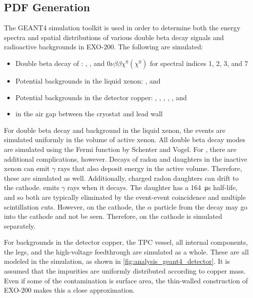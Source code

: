 \documentclass[herrin-thesis.tex]{subfiles}
\begin{document}
\subsection{PDF Generation}

The GEANT4 simulation toolkit\cite{Agostinelli:2003fk} is used in order to determine both the energy spectra and spatial distributions of various double beta decay signals and radioactive backgrounds in EXO-200. The following are simulated:
\begin{itemize}
\item Double beta decay of :
	\twonu{},
	\zeronu{},
	and \(0\nu\beta\beta\chi^{0}(\chi^{0})\) for spectral indices 1, 2, 3, and 7
\item Potential backgrounds in the liquid xenon:
	,
	and 
\item Potential backgrounds in the detector copper:
	, 
	,
	,
	,
	,
	and 
\item {} in the air gap between the cryostat and lead wall
\end{itemize}

For double beta decay and background in the liquid xenon, the events are simulated uniformly in the volume of active xenon. All double beta decay modes are simulated using the Fermi function by Schenter and Vogel\cite{Schenter:1983uq}. For , there are additional complications, however. Decays of radon and daughters in the inactive xenon can emit \(\gamma\) rays that also deposit energy in the active volume. Therefore, these are simulated as well. Additionally, charged radon daughters can drift to the cathode.  emits \(\gamma\) rays when it decays. The daughter  has a \SI{164}{\micro\s} half-life, and so both are typically eliminated by the event-event coincidence and multiple scintillation cuts. However, on the cathode, the \(\alpha\) particle from the  decay may go into the cathode and not be seen. Therefore,  on the cathode is simulated separately.

For backgrounds in the detector copper, the TPC vessel, all internal components, the legs, and the high-voltage feedthrough are simulated as a whole. These are all modeled in the simulation, as shown in \cref{fig:analysis_geant4_detector}. It is assumed that the impurities are uniformly distributed according to copper mass. Even if some of the contamination is surface area, the thin-walled construction of EXO-200 makes this a close approximation.
\end{document}
